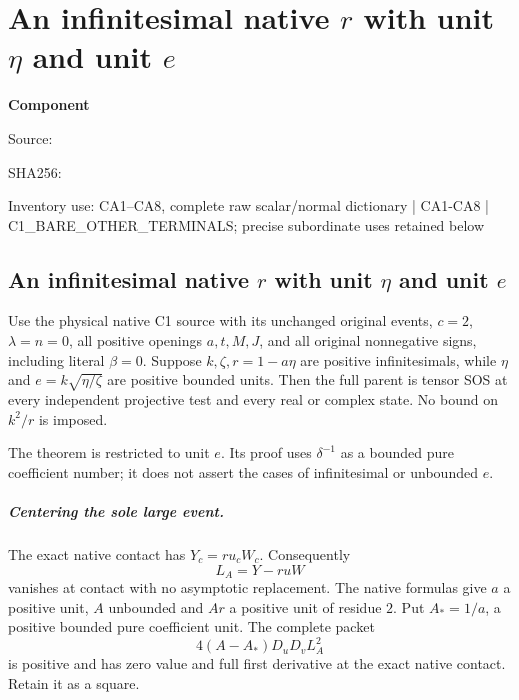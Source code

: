 \chapter{An infinitesimal native $r$ with unit $\eta$ and unit $e$}
\label{component:p3763434080c2}
\noindent\textbf{Component }\par
{\small\noindent Source: \par}
{\small\noindent SHA256: \par}
{\small\noindent Inventory use: CA1--CA8, complete raw scalar/normal dictionary | CA1-CA8 | C1\_\allowbreak{}BARE\_\allowbreak{}OTHER\_\allowbreak{}TERMINALS; precise subordinate uses retained below\par}
\medskip
\section[An infinitesimal native r with unit eta and unit e]{An infinitesimal native $r$ with unit $\eta$ and unit $e$}

\begin{theorem}
Use the physical native C1 source with its unchanged original events,
$c=2$, $\lambda=n=0$, all positive openings $a,t,M,J$, and all original
nonnegative signs, including literal $\beta=0$.
Suppose $k,\zeta,r=1-a\eta$ are positive infinitesimals, while
$\eta$ and $e=k\sqrt{\eta/\zeta}$ are positive bounded units.
Then the full parent is tensor SOS at every independent projective test
and every real or complex state. No bound on $k^2/r$ is imposed.
\end{theorem}

The theorem is restricted to unit $e$. Its proof uses $\delta^{-1}$
as a bounded pure coefficient number; it does not assert the cases of
infinitesimal or unbounded $e$.

\paragraph{Centering the sole large event.}
The exact native contact has $Y_c=r u_cW_c$. Consequently
\[
 L_A=Y-r uW
\]
vanishes at contact with no asymptotic replacement. The native formulas
give $a$ a positive unit, $A$ unbounded and $Ar$ a positive unit of
residue $2$. Put $A_*=1/a$, a positive bounded pure coefficient unit.
The complete packet
\[
             4(A-A_*)D_uD_v L_A^2                         \tag{CA1}
\]
is positive and has zero value and full first derivative at the exact
native contact. Retain it as a square.

